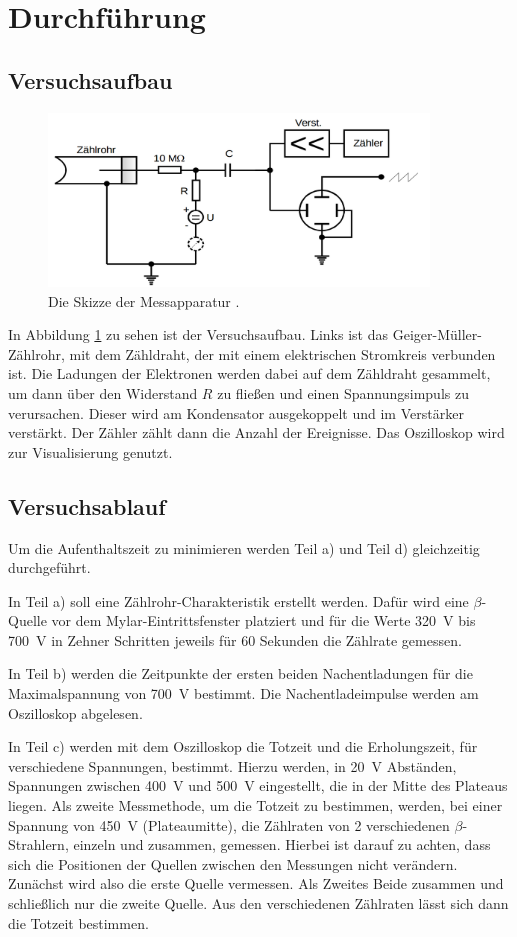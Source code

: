 \documentclass[
  bibliography=totoc,     %
  captions=tableheading,  %
  titlepage=firstiscover, %
]{scrartcl}
\begin{document}
\section{Durchführung}
\subsection{Versuchsaufbau}
\begin{figure}[htb]
  \centering
  \includegraphics[width=0.9\textwidth]{V7035.png}
  \caption{Die Skizze der Messapparatur \cite{anleitung}.}
  \label{fig:V7035}
\end{figure}

\noindent
In Abbildung \ref{fig:V7035} zu sehen ist der Versuchsaufbau. Links ist das
Geiger-Müller-Zählrohr, mit dem Zähldraht, der mit einem
elektrischen Stromkreis verbunden ist. Die Ladungen der Elektronen werden dabei
auf dem Zähldraht gesammelt, um dann über den Widerstand $R$ zu fließen
und einen Spannungsimpuls zu verursachen. Dieser wird am Kondensator
ausgekoppelt und im Verstärker verstärkt. Der Zähler zählt dann die Anzahl
der Ereignisse. Das Oszilloskop wird zur Visualisierung genutzt.
\subsection{Versuchsablauf}
Um die Aufenthaltszeit zu minimieren werden Teil a) und Teil d) gleichzeitig
durchgeführt.

\noindent
In Teil a) soll eine Zählrohr-Charakteristik erstellt werden. Dafür wird eine
$\beta$-Quelle vor dem Mylar-Eintrittsfenster platziert und für die Werte
\SI{320}{\volt} bis \SI{700}{\volt} in Zehner Schritten jeweils für 60 Sekunden
die Zählrate gemessen.

\noindent
In Teil b) werden die Zeitpunkte der ersten beiden Nachentladungen für die
Maximalspannung von \SI{700}{\volt} bestimmt. Die Nachentladeimpulse werden am
Oszilloskop abgelesen.

\noindent
In Teil c) werden mit dem Oszilloskop die Totzeit und die Erholungszeit, für
verschiedene Spannungen, bestimmt. Hierzu werden, in \SI{20}{\volt} Abständen,
Spannungen zwischen \SI{400}{\volt} und \SI{500}{\volt} eingestellt, die in
der Mitte des Plateaus liegen.
Als zweite Messmethode, um die Totzeit zu bestimmen, werden, bei einer Spannung
von \SI{450}{\volt} (Plateaumitte), die Zählraten von 2 verschiedenen $\beta$-Strahlern,
einzeln und zusammen, gemessen. Hierbei ist darauf zu achten, dass sich die Positionen
der Quellen zwischen den Messungen nicht verändern. Zunächst wird also die erste
Quelle vermessen. Als Zweites Beide zusammen und schließlich nur die zweite Quelle.
Aus den verschiedenen Zählraten lässt sich dann die Totzeit bestimmen.
\end{document}
